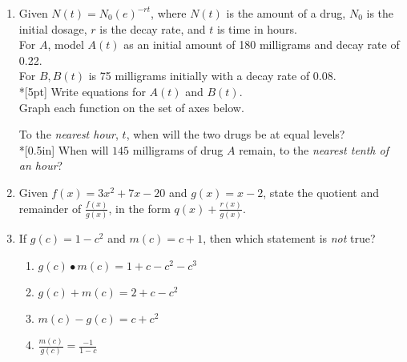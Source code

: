 \documentclass[12pt, oneside]{article}
\begin{document}
\begin{enumerate}
\item Given $N(t)=N_0(e)^{-rt}$, where $N(t)$ is the amount of a drug, $N_0$ is the initial dosage, $r$ is the decay rate, and $t$ is time in hours.\\[5pt] For $A$, model $A(t)$ as an initial amount of 180 milligrams and decay rate of 0.22.\\[5pt]
For $B, B(t)$ is 75 milligrams initially with a decay rate of 0.08.\\*[5pt]
Write equations for $A(t)$ and $B(t)$.\\[.75in]
Graph each function on the set of axes below.
\begin{center}
\end{center}
To the \emph{nearest hour}, $t$, when will the two drugs be at equal levels?\\*[0.5in]
When will $145$ milligrams of drug $A$ remain, to the \emph{nearest tenth of an hour}? 

\newpage

\item Given $f(x)=3x^2+7x-20$ and $g(x)=x-2$, state the quotient and remainder of $\displaystyle \frac{f(x)}{g(x)}$, in the form $\displaystyle q(x)+ \frac{r(x)}{g(x)}$. \\[4in] %

\item If $g(c)=1-c^2$ and $m(c)=c+1$, then which statement is \emph{not} true?
\begin{enumerate}
    \item $g(c) \bullet m(c) = 1+c-c^2-c^3$
    \item $g(c) + m(c) = 2+c-c^2$
    \item $m(c) - g(c) = c+c^2$
    \item $\displaystyle \frac{m(c)}{g(c)} = \frac{-1}{1-c}$
\end{enumerate} %


\end{enumerate}
\end{document}
